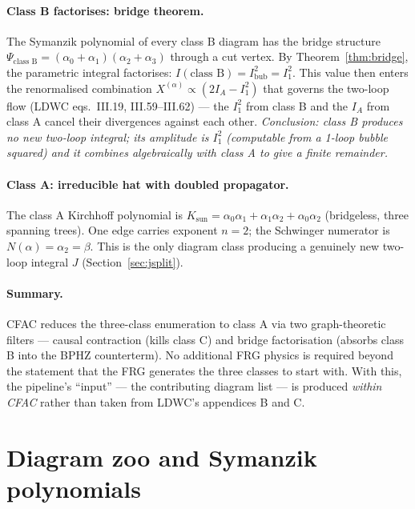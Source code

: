 \documentclass[10pt,a4paper,twocolumn]{article}
\theoremstyle{plain}
\theoremstyle{definition}
\renewcommand{\Psi}{\varPsi}
\begin{document}
\paragraph{Class B factorises: bridge theorem.}
The Symanzik polynomial of every class B diagram has the bridge
structure $\Psi_{\text{class B}} = (\alpha_0{+}\alpha_1)(\alpha_2{+}\alpha_3)$
through a cut vertex.
By Theorem~\ref{thm:bridge}, the parametric integral factorises:
$I(\text{class B}) = I_{\text{bub}}^2 = I_1^2$.
This value then enters the renormalised combination
$X^{(\alpha)} \propto (2I_A - I_1^2)$ that governs the two-loop
flow (LDWC eqs.~III.19, III.59--III.62) --- the $I_1^2$ from
class B and the $I_A$ from class A cancel their divergences
against each other.
\emph{Conclusion: class B produces no new two-loop integral;
its amplitude is $I_1^2$ (computable from a 1-loop bubble squared)
and it combines algebraically with class A to give a finite
remainder.}

\paragraph{Class A: irreducible hat with doubled propagator.}
The class A Kirchhoff polynomial is $K_{\text{sun}} =
\alpha_0\alpha_1 + \alpha_1\alpha_2 + \alpha_0\alpha_2$ (bridgeless,
three spanning trees).  One edge carries exponent $n=2$; the
Schwinger numerator is $N(\alpha) = \alpha_2 = \beta$.
This is the only diagram class producing a genuinely new
two-loop integral $J$ (Section~\ref{sec:jsplit}).

\paragraph{Summary.}
CFAC reduces the three-class enumeration to class A via two
graph-theoretic filters --- causal contraction (kills class C) and
bridge factorisation (absorbs class B into the BPHZ counterterm).
No additional FRG physics is required beyond the statement that
the FRG generates the three classes to start with.
With this, the pipeline's ``input'' --- the contributing diagram
list --- is produced \emph{within CFAC} rather than taken from
LDWC's appendices B and C.

\section{Diagram zoo and Symanzik polynomials}
\label{sec:diagrams}
\end{document}
